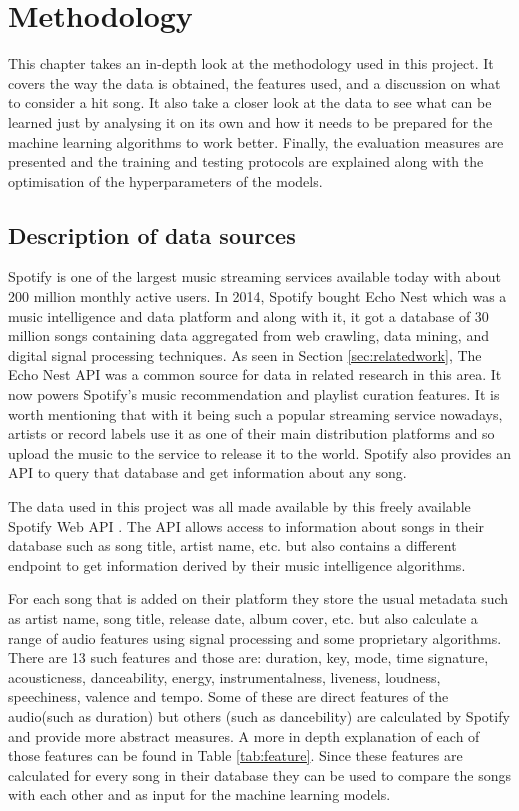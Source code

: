 \chapter{Methodology}

This chapter takes an in-depth look at the methodology used in this project. It covers the way the data is obtained, the features used, and a discussion on what to consider a hit song. It also take a closer look at the data to see what can be learned just by analysing it on its own and how it needs to be prepared for the machine learning algorithms to work better. Finally, the evaluation measures are presented and the training and testing protocols are explained along with the optimisation of the hyperparameters of the models.

\section{Description of data sources}
Spotify \cite{kreitz2010spotify} is one of the largest music streaming services available today with about 200 million monthly active users. In 2014, Spotify bought Echo Nest \cite{SpotifyEchoAquisition:online} which was a music intelligence and data platform and along with it, it got a database of 30 million songs \cite{TheEchoN16:online} containing data aggregated from web crawling, data mining, and digital signal processing techniques. As seen in Section \ref{sec:relatedwork}, The Echo Nest API was a common source for data in related research in this area. It now powers Spotify's music recommendation and playlist curation features. It is worth mentioning that with it being such a popular streaming service nowadays, artists or record labels use it as one of their main distribution platforms and so upload the music to the service to release it to the world. Spotify also provides an API to query that database and get information about any song. 

The data used in this project was all made available by this freely available Spotify Web API \cite{WebAPI:online}. The API allows access to information about songs in their database such as song title, artist name, etc. but also contains a different endpoint to get information derived by their music intelligence algorithms. 

For each song that is added on their platform they store the usual metadata such as artist name, song title, release date, album cover, etc. but also calculate a range of audio features using signal processing and some proprietary algorithms. There are 13 such features and those are: duration, key, mode, time signature, acousticness, danceability, energy, instrumentalness, liveness, loudness, speechiness, valence and tempo. Some of these are direct features of the audio(such as duration) but others (such as dancebility) are calculated by Spotify and provide more abstract measures. A more in depth explanation of each of those features can be found in Table \ref{tab:feature}.
Since these features are calculated for every song in their database they can be used to compare the songs with each other and as input for the machine learning models.

